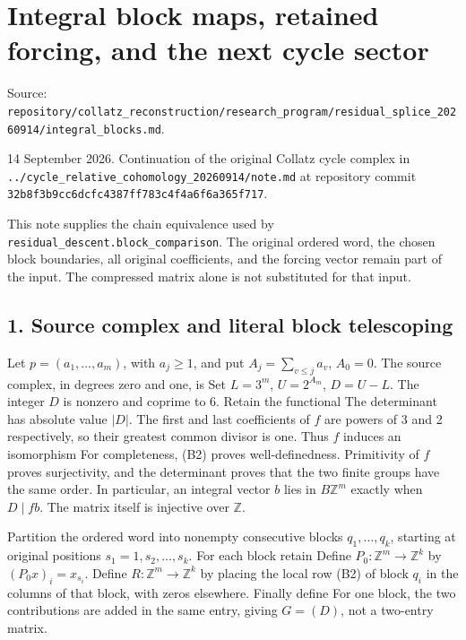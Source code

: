 \chapter{Integral block maps, retained forcing, and the next cycle
sector}
{\small\sffamily Source: \nolinkurl{repository/collatz_reconstruction/research_program/residual_splice_20260914/integral_blocks.md}.\par}


14 September 2026. Continuation of the original Collatz cycle complex in
\nolinkurl{../cycle_relative_cohomology_20260914/note.md} at repository
commit \nolinkurl{32b8f3b9cc6dcfc4387ff783c4f4a6f6a365f717}.

This note supplies the chain equivalence used by
\nolinkurl{residual_descent.block_comparison}. The original ordered
word, the chosen block boundaries, all original coefficients, and the
forcing vector remain part of the input. The compressed matrix alone is
not substituted for that input.

\section{1. Source complex and literal block telescoping}

Let \(p=(a_1,\ldots,a_m)\), with \(a_j\ge1\), and put
\(A_j=\sum_{v\le j}a_v\), \(A_0=0\). The source complex, in degrees zero
and one, is
 Set \(L=3^m\),
\(U=2^{A_m}\), \(D=U-L\). The integer \(D\) is nonzero and coprime to 6.
Retain the functional
 The
determinant has absolute value \(|D|\). The first and last coefficients
of \(f\) are powers of 3 and 2 respectively, so their greatest common
divisor is one. Thus \(f\) induces an isomorphism
 For completeness, (B2) proves
well-definedness. Primitivity of \(f\) proves surjectivity, and the
determinant proves that the two finite groups have the same order. In
particular, an integral vector \(b\) lies in \(B\mathbb Z^m\) exactly
when \(D\mid f b\). The matrix itself is injective over \(\mathbb Z\).

Partition the ordered word into nonempty consecutive blocks
\(q_1,\ldots,q_k\), starting at original positions
\(s_1=1,s_2,\ldots,s_k\). For each block retain
 Define
\(P_0:\mathbb Z^m\to\mathbb Z^k\) by \((P_0x)_i=x_{s_i}\). Define
\(R:\mathbb Z^m\to\mathbb Z^k\) by placing the local row (B2) of block
\(q_i\) in the columns of that block, with zeros elsewhere. Finally
define 
For one block, the two contributions are added in the same entry, giving
\(G=(D)\), not a two-entry matrix.


